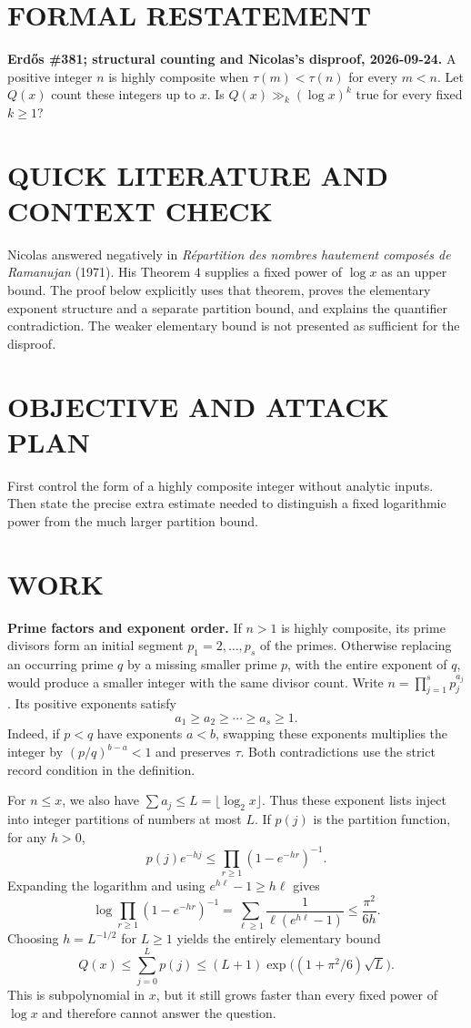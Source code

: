 \section{FORMAL RESTATEMENT}
\textbf{Erd\H{o}s \#381; structural counting and Nicolas's disproof, 2026-09-24.}
A positive integer $n$ is highly composite when $\tau(m)<\tau(n)$ for every $m<n$. Let $Q(x)$ count these integers up to $x$. Is $Q(x)\gg_k(\log x)^k$ true for every fixed $k\geq1$?

\section{QUICK LITERATURE AND CONTEXT CHECK}
Nicolas answered negatively in \emph{R\'epartition des nombres hautement compos\'es de Ramanujan} (1971). His Theorem 4 supplies a fixed power of $\log x$ as an upper bound. The proof below explicitly uses that theorem, proves the elementary exponent structure and a separate partition bound, and explains the quantifier contradiction. The weaker elementary bound is not presented as sufficient for the disproof.

\section{OBJECTIVE AND ATTACK PLAN}
First control the form of a highly composite integer without analytic inputs. Then state the precise extra estimate needed to distinguish a fixed logarithmic power from the much larger partition bound.

\section{WORK}
\textbf{Prime factors and exponent order.} If $n>1$ is highly composite, its prime divisors form an initial segment $p_1=2,\ldots,p_s$ of the primes. Otherwise replacing an occurring prime $q$ by a missing smaller prime $p$, with the entire exponent of $q$, would produce a smaller integer with the same divisor count. Write $n=\prod_{j=1}^s p_j^{a_j}$. Its positive exponents satisfy
\[
a_1\geq a_2\geq\cdots\geq a_s\geq1.                     \tag{1}
\]
Indeed, if $p<q$ have exponents $a<b$, swapping these exponents multiplies the integer by $(p/q)^{b-a}<1$ and preserves $\tau$. Both contradictions use the strict record condition in the definition.

For $n\leq x$, we also have $\sum a_j\leq L=\lfloor\log_2x\rfloor$. Thus these exponent lists inject into integer partitions of numbers at most $L$. If $p(j)$ is the partition function, for any $h>0$,
\[
p(j)e^{-hj}\leq\prod_{r\geq1}(1-e^{-hr})^{-1}.
\]
Expanding the logarithm and using $e^{h\ell}-1\geq h\ell$ gives
\[
\log\prod_{r\geq1}(1-e^{-hr})^{-1}
=\sum_{\ell\geq1}\frac1{\ell(e^{h\ell}-1)}
\leq\frac{\pi^2}{6h}.
\]
Choosing $h=L^{-1/2}$ for $L\geq1$ yields the entirely elementary bound
\[
Q(x)\leq\sum_{j=0}^{L}p(j)
\leq(L+1)\exp\!\big((1+\pi^2/6)\sqrt L\big).             \tag{2}
\]
This is subpolynomial in $x$, but it still grows faster than every fixed power of $\log x$ and therefore cannot answer the question.

